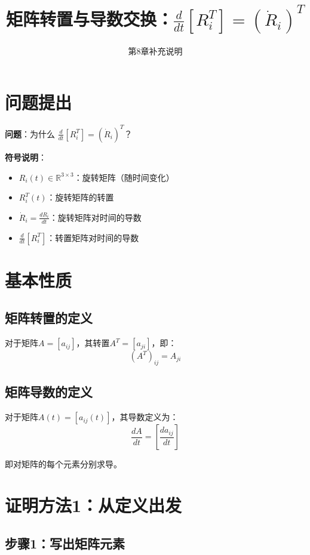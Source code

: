 \documentclass[12pt,a4paper]{article}
\title{矩阵转置与导数交换：$\frac{d}{dt}[R_i^T] = (\dot{R}_i)^T$}
\author{第8章补充说明}
\date{}
\begin{document}
\maketitle

\section{问题提出}

\textbf{问题}：为什么 $\frac{d}{dt}[R_i^T] = (\dot{R}_i)^T$？

\textbf{符号说明}：
\begin{itemize}
\item $R_i(t) \in \mathbb{R}^{3 \times 3}$：旋转矩阵（随时间变化）
\item $R_i^T(t)$：旋转矩阵的转置
\item $\dot{R}_i = \frac{dR_i}{dt}$：旋转矩阵对时间的导数
\item $\frac{d}{dt}[R_i^T]$：转置矩阵对时间的导数
\end{itemize}

\section{基本性质}

\subsection{矩阵转置的定义}

对于矩阵$A = [a_{ij}]$，其转置$A^T = [a_{ji}]$，即：
\begin{equation}
(A^T)_{ij} = A_{ji}
\end{equation}

\subsection{矩阵导数的定义}

对于矩阵$A(t) = [a_{ij}(t)]$，其导数定义为：
\begin{equation}
\frac{dA}{dt} = \left[\frac{da_{ij}}{dt}\right]
\end{equation}

即对矩阵的每个元素分别求导。

\section{证明方法1：从定义出发}

\subsection{步骤1：写出矩阵元素}
\end{document}
